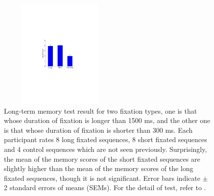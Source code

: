 \documentclass[10pt,letterpaper]{article}
\begin{document}
\begin{figure}
  \centerline{\includegraphics[width=60mm,height=54mm,trim=65mm 103mm 68mm 100mm]{./eps/memtest_leng}}
  \caption{Long-term memory test result for two fixation types, one is that whose duration of fixation is longer than 1500 ms, and the other one is that whose duration of fixation is shorter than 300 ms. Each participant rates 8 long fixated sequences, 8 short fixated sequences and 4 control sequences which are not seen previously. Surprisingly, the mean of the memory scores of the short fixated sequences are slightly higher than the mean of the memory scores of the long fixated sequences, though it is not significant. Error bars indicate $\pm$ 2 standard errors of means (SEMs). For the detail of test, refer to \textit{}.}
  \label{fig:memtest-leng}
\end{figure}
\end{document}
